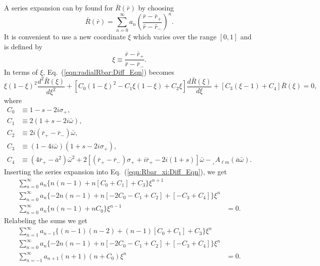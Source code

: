 \documentclass[11pt]{article}
\newcommand{\scA}[4][]{{}_{{}_{#2}}A^{#1}_{#3}(#4)}
\begin{document}
A series expansion can by found for $\bar{R}(\bar{r})$ by choosing
\begin{equation}
  \bar{R}(\bar{r}) = \sum_{n=0}^\infty{a_n\left(
       \frac{\bar{r}-\bar{r}_+}{\bar{r}-\bar{r}_\minus}\right)^n}.
\end{equation}
It is convenient to use a new coordinate $\xi$ which varies over the
range $[0,1]$ and is defined by
\begin{equation}
  \xi \equiv \frac{\bar{r}-\bar{r}_+}{\bar{r}-\bar{r}_\minus}.
\end{equation}
In terms of $\xi$, Eq.~(\ref{eqn:radialRbar:Diff_Eqn}) becomes
\begin{equation}\label{eqn:Rbar_xi:Diff_Eqn}
  \xi(1-\xi)^2\frac{d^2\bar{R}(\xi)}{d\xi^2}
  + [C_0(1-\xi)^2 - C_1\xi(1-\xi) + C_2\xi]
            \frac{d\bar{R}(\xi)}{d\xi}
  + [C_3(\xi-1) + C_4]\bar{R}(\xi) = 0,
\end{equation}
where
\begin{align}
  C_0 &\equiv 1-s-2i\sigma_+, \\
  C_1 &\equiv 2(1+s-2i\bar\omega), \\
  C_2 &\equiv 2i(\bar{r}_+-\bar{r}_\minus)\bar\omega, \\
  C_3 &\equiv (1-4i\bar\omega)(1+s-2i\sigma_+), \\
  C_4 &\equiv (4\bar{r}_+-\bar{a}^2)\bar\omega^2
              + 2[(\bar{r}_+-\bar{r}_\minus)\sigma_+ + i\bar{r}_+ 
                  - 2i(1+s)]\bar\omega - \scA{s}{\ell{m}}{\bar{a}\bar\omega}.
\end{align}
Inserting the series expansion into Eq.~(\ref{eqn:Rbar_xi:Diff_Eqn}), we get
\begin{equation}
\begin{aligned}
  \sum_{n=0}^\infty{a_n\{n(n-1) + n[C_0+C_1] + C_3\}}\xi^{n+1} & \\
  \sum_{n=0}^\infty{a_n\{-2n(n-1) + n[-2C_0-C_1+C_2] + [-C_3+C_4]\}}\xi^n & \\
  \sum_{n=0}^\infty{a_n\{n(n-1) + nC_0\}}\xi^{n-1} &=0.
\end{aligned}
\end{equation}
Relabeling the sums we get
\begin{equation}
\begin{aligned}
  \sum_{n=1}^\infty{a_{n-1}\{(n-1)(n-2) + (n-1)[C_0+C_1] + C_3\}}\xi^n & \\
  \sum_{n=0}^\infty{a_n\{-2n(n-1) + n[-2C_0-C_1+C_2] + [-C_3+C_4]\}}\xi^n & \\
  \sum_{n=-1}^\infty{a_{n+1}(n+1)(n+C_0)}\xi^n &=0.
\end{aligned}
\end{equation}
\end{document}
